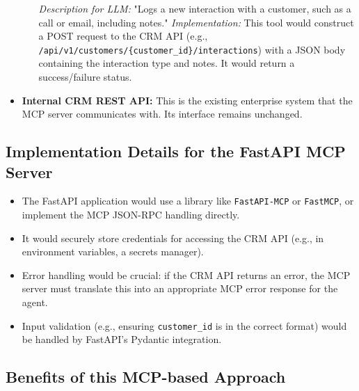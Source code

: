 \begin{itemize}
\begin{itemize}
        \textit{Description for LLM:} "Logs a new interaction with a customer, such as a call or email, including notes."
        \textit{Implementation:} This tool would construct a POST request to the CRM API 
        (e.g., \texttt{/api/v1/customers/\{customer\_id\}/interactions}) with a JSON body containing the interaction type and notes. 
        It would return a success/failure status.
    \end{itemize}
    \item \textbf{Internal CRM REST API:} This is the existing enterprise system that the MCP server communicates with. Its interface remains unchanged.
\end{itemize}

\subsection*{Implementation Details for the FastAPI MCP Server}

\begin{itemize}
    \item The FastAPI application would use a library like \texttt{FastAPI-MCP} or \texttt{FastMCP}, or implement the MCP JSON-RPC handling directly.
    \item It would securely store credentials for accessing the CRM API (e.g., in environment variables, a secrets manager).
    \item Error handling would be crucial: if the CRM API returns an error, the MCP server must translate this into an appropriate MCP error response for the agent.
    \item Input validation (e.g., ensuring \texttt{customer\_id} is in the correct format) would be handled by FastAPI's Pydantic integration.
\end{itemize}

\subsection*{Benefits of this MCP-based Approach}


